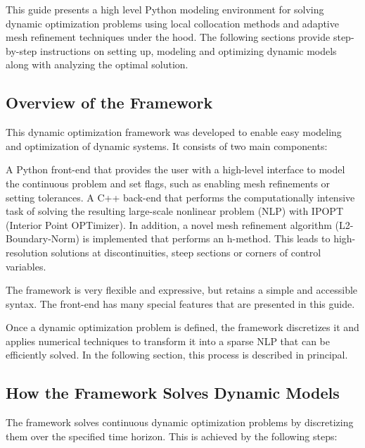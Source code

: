 \documentclass[12pt]{article}
\begin{document}
This guide presents a high level Python modeling environment for
solving dynamic optimization problems using local collocation methods and
adaptive mesh refinement techniques under the hood.
The following sections provide
step-by-step instructions on setting up, modeling and optimizing dynamic models
along with analyzing the optimal solution.

\subsection{Overview of the Framework} \label{c:overview}

This dynamic optimization framework was developed to enable easy modeling and optimization of dynamic systems. It consists of two main components:

A Python front-end that provides the user with a high-level interface to model the continuous problem and set flags, such as enabling mesh refinements or setting tolerances.
A C++ back-end that performs the computationally intensive task of solving the resulting large-scale nonlinear problem (NLP) with IPOPT (Interior Point OPTimizer). In addition, a novel mesh refinement algorithm (L2-Boundary-Norm) is implemented that performs an h-method. This leads to high-resolution solutions at discontinuities, steep sections or corners of control variables.

The framework is very flexible and expressive, but retains a simple and accessible syntax. The front-end has many special features that are presented in this guide.

Once a dynamic optimization problem is defined, the framework discretizes it and applies numerical techniques to transform it into a sparse NLP that can be efficiently solved. In the following section, this process is described in principal.

\subsection{How the Framework Solves Dynamic Models} \label{c:collocation}

The framework solves continuous dynamic optimization problems by discretizing them over the specified time horizon. This is achieved by the following steps:
\end{document}
